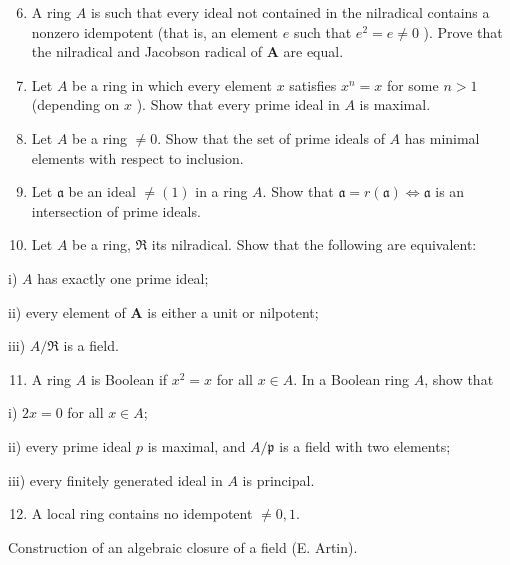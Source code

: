 \documentclass{standalone}
\theoremstyle{definition}
\theoremstyle{remark}
\begin{document}
\begin{enumerate}
  \setcounter{enumi}{5}
  \item A ring $A$ is such that every ideal not contained in the nilradical contains a nonzero idempotent (that is, an element $e$ such that $e^{2}=e \neq 0$ ). Prove that the nilradical and Jacobson radical of $\boldsymbol{A}$ are equal.

  \item Let $A$ be a ring in which every element $x$ satisfies $x^{n}=x$ for some $n>1$ (depending on $x$ ). Show that every prime ideal in $A$ is maximal.

  \item Let $A$ be a ring $\neq 0$. Show that the set of prime ideals of $A$ has minimal elements with respect to inclusion.

  \item Let $\mathfrak{a}$ be an ideal $\neq(1)$ in a ring $A$. Show that $\mathfrak{a}=r(\mathfrak{a}) \Leftrightarrow \mathfrak{a}$ is an intersection of prime ideals.

  \item Let $A$ be a ring, $\mathfrak{R}$ its nilradical. Show that the following are equivalent:

\end{enumerate}

i) $A$ has exactly one prime ideal;

ii) every element of $\boldsymbol{A}$ is either a unit or nilpotent;

iii) $A / \mathfrak{R}$ is a field.

\begin{enumerate}
  \setcounter{enumi}{10}
  \item A ring $A$ is Boolean if $x^{2}=x$ for all $x \in A$. In a Boolean ring $A$, show that
\end{enumerate}

i) $2 x=0$ for all $x \in A$;

ii) every prime ideal $p$ is maximal, and $A / \mathfrak{p}$ is a field with two elements;

iii) every finitely generated ideal in $A$ is principal.

\begin{enumerate}
  \setcounter{enumi}{11}
  \item A local ring contains no idempotent $\neq 0,1$.
\end{enumerate}

Construction of an algebraic closure of a field (E. Artin).
\end{document}
